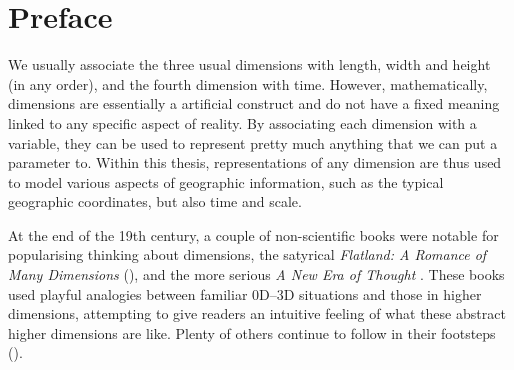 
\chapter*{Preface}

We usually associate the three usual dimensions with length, width and height (in any order), and the fourth dimension with time. 
However, mathematically, dimensions are essentially a artificial construct and do not have a fixed meaning linked to any specific aspect of reality.
By associating each dimension with a variable, they can be used to represent pretty much anything that we can put a parameter to.
Within this thesis, representations of any dimension are thus used to model various aspects of geographic information, such as the typical geographic coordinates, but also time and scale.

At the end of the 19th century, a couple of non-scientific books were notable for popularising thinking about dimensions, the satyrical \emph{Flatland: A Romance of Many Dimensions} \citep{Abbott84} (), and the more serious \emph{A New Era of Thought} \citep{Hinton88}.
These books used playful analogies between familiar 0D--3D situations and those in higher dimensions, attempting to give readers an intuitive feeling of what these abstract higher dimensions are like.
Plenty of others continue to follow in their footsteps ().

